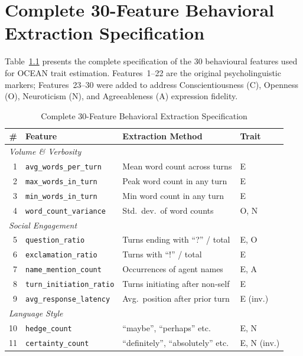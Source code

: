 \documentclass[12pt, a4paper]{report}
\begin{document}
\chapter{Complete 30-Feature Behavioral Extraction Specification}
\label{app:features}

Table~\ref{tab:full_features} presents the complete specification of the 30 behavioural features used for OCEAN trait estimation. Features~1--22 are the original psycholinguistic markers; Features~23--30 were added to address Conscientiousness (C), Openness (O), Neuroticism (N), and Agreeableness (A) expression fidelity.

\begin{table}[t]
\centering
\caption{Complete 30-Feature Behavioral Extraction Specification}
\label{tab:full_features}
\footnotesize
\begin{tabular}{r l p{4.5cm} l}
\toprule
\# & Feature & Extraction Method & Trait \\
\midrule
\multicolumn{4}{l}{\textit{Volume \& Verbosity}} \\
1  & \texttt{avg\_words\_per\_turn}    & Mean word count across turns & E \\
2  & \texttt{max\_words\_in\_turn}     & Peak word count in any turn & E \\
3  & \texttt{min\_words\_in\_turn}     & Min word count in any turn & E \\
4  & \texttt{word\_count\_variance}    & Std.\ dev.\ of word counts & O, N \\
\midrule
\multicolumn{4}{l}{\textit{Social Engagement}} \\
5  & \texttt{question\_ratio}          & Turns ending with ``?'' / total & E, O \\
6  & \texttt{exclamation\_ratio}       & Turns with ``!'' / total & E \\
7  & \texttt{name\_mention\_count}     & Occurrences of agent names & E, A \\
8  & \texttt{turn\_initiation\_ratio}  & Turns initiating after non-self & E \\
9  & \texttt{avg\_response\_latency}   & Avg.\ position after prior turn & E (inv.) \\
\midrule
\multicolumn{4}{l}{\textit{Language Style}} \\
10 & \texttt{hedge\_count}             & ``maybe'', ``perhaps'' etc. & E, N \\
11 & \texttt{certainty\_count}         & ``definitely'', ``absolutely'' etc. & E, N (inv.) \\

\end{tabular}
\end{table}
\end{document}
